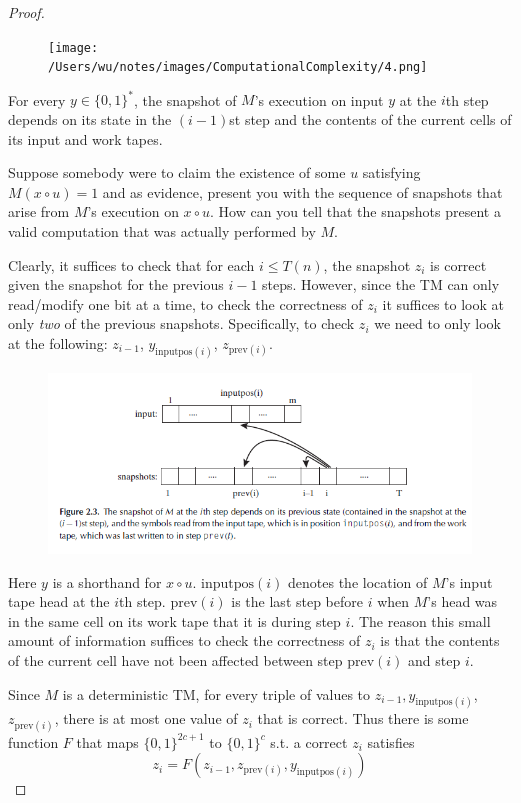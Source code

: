\documentclass[11pt]{article}
\begin{document}
\begin{proof}
\begin{figure}[htbp]
\centering
\texttt{[image: /Users/wu/notes/images/ComputationalComplexity/4.png]}
\end{figure}

For every \(y\in\{0,1\}^*\), the snapshot of \(M\)'s execution on input \(y\) at the \(i\)th
step depends on its state in the \((i-1)\)st step and the contents of the current cells of its
input and work tapes.

Suppose somebody were to claim the existence of some \(u\) satisfying \(M(x\circ u)=1\) and as
evidence, present you with the sequence of snapshots that arise from \(M\)'s execution
on \(x\circ u\). How can you tell that the snapshots present a valid computation that was
actually performed by \(M\).

Clearly, it suffices to check that for each \(i\le T(n)\), the snapshot \(z_i\) is correct
given the snapshot for the previous \(i-1\) steps. However, since the TM can only read/modify
one bit at a time, to check the correctness of \(z_i\) it suffices to look at only \emph{two} of the
previous snapshots. Specifically, to check \(z_i\) we need to only look at the following:
\(z_{i-1}\), \(y_{\text{inputpos}(i)}\), \(z_{\text{prev}(i)}\). 

\begin{figure}[htbp]
\centering
\includegraphics[width=.8\textwidth]{../images/ComputationalComplexity/5.png}
\end{figure}

Here \(y\) is a shorthand
for \(x\circ u\). \(\text{inputpos}(i)\) denotes the location of \(M\)'s input tape head at
the \(i\)th step. \(\text{prev}(i)\) is the last step before \(i\) when \(M\)'s head was in the
same cell on its work tape that it is during step \(i\). The reason this small amount of
information suffices to check the correctness of \(z_i\) is that the contents of the current
cell have not been affected between step \(\text{prev}(i)\) and step \(i\).

Since \(M\) is a deterministic TM, for every triple of values
to \(z_{i-1},y_{\text{inputpos}(i)}\), \(z_{\text{prev}(i)}\), there is at most one value
of \(z_i\) that is correct. Thus there is some function \(F\) that maps \(\{0,1\}^{2c+1}\)
to \(\{0,1\}^c\) s.t. a correct \(z_i\) satisfies
     \begin{equation*}
z_i=F(z_{i-1},z_{\text{prev}(i)},y_{\text{inputpos}(i)})
     \end{equation*}


\end{proof}
\end{document}
